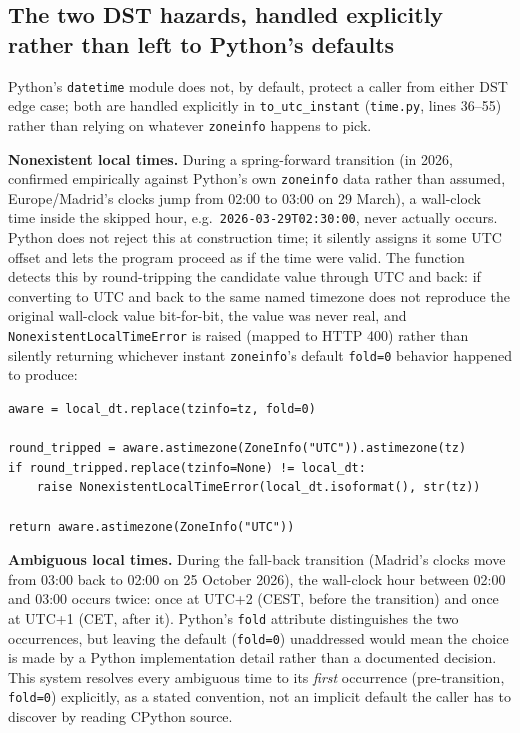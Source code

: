 \documentclass[11pt,a4paper]{article}
\begin{document}
\subsection{The two DST hazards, handled explicitly rather than left to Python's defaults}

Python's \texttt{datetime} module does not, by default, protect a caller
from either DST edge case; both are handled explicitly in
\texttt{to\_utc\_instant} (\texttt{time.py}, lines 36--55) rather than
relying on whatever \texttt{zoneinfo} happens to pick.

\textbf{Nonexistent local times.} During a spring-forward transition (in
2026, confirmed empirically against Python's own \texttt{zoneinfo} data
rather than assumed, Europe/Madrid's clocks jump from 02:00 to 03:00 on 29
March), a wall-clock time inside the skipped hour, e.g.\
\texttt{2026-03-29T02:30:00}, never actually occurs. Python does not
reject this at construction time; it silently assigns it some UTC offset
and lets the program proceed as if the time were valid. The function
detects this by round-tripping the candidate value through UTC and back:
if converting to UTC and back to the same named timezone does not reproduce
the original wall-clock value bit-for-bit, the value was never real, and
\texttt{NonexistentLocalTimeError} is raised (mapped to HTTP 400) rather
than silently returning whichever instant \texttt{zoneinfo}'s default
\texttt{fold=0} behavior happened to produce:

\begin{lstlisting}[caption={Detecting a spring-forward gap by round-tripping. \texttt{backend/app/domain/time.py}, lines 45--55.}]
aware = local_dt.replace(tzinfo=tz, fold=0)

round_tripped = aware.astimezone(ZoneInfo("UTC")).astimezone(tz)
if round_tripped.replace(tzinfo=None) != local_dt:
    raise NonexistentLocalTimeError(local_dt.isoformat(), str(tz))

return aware.astimezone(ZoneInfo("UTC"))
\end{lstlisting}

\textbf{Ambiguous local times.} During the fall-back transition (Madrid's
clocks move from 03:00 back to 02:00 on 25 October 2026), the wall-clock
hour between 02:00 and 03:00 occurs twice: once at UTC+2 (CEST, before the
transition) and once at UTC+1 (CET, after it). Python's \texttt{fold}
attribute distinguishes the two occurrences, but leaving the default
(\texttt{fold=0}) unaddressed would mean the choice is made by a Python
implementation detail rather than a documented decision. This system
resolves every ambiguous time to its \emph{first} occurrence
(pre-transition, \texttt{fold=0}) explicitly, as a stated convention, not
an implicit default the caller has to discover by reading CPython source.
\end{document}
